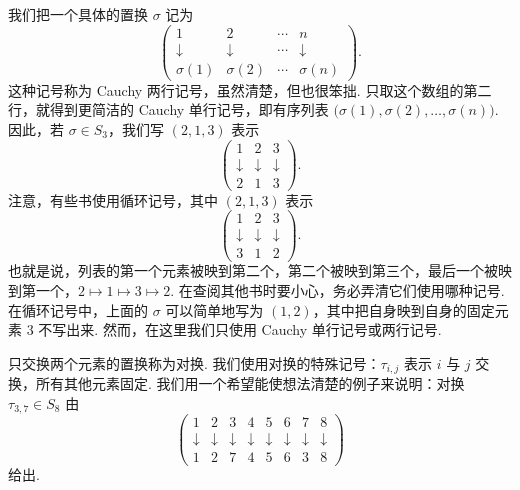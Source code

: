 我们把一个具体的置换 $\sigma$ 记为
\[
\begin{pmatrix}1&2&\cdots&n\\\downarrow&\downarrow&\cdots&\downarrow\\\sigma(1)&\sigma(2)&\cdots&\sigma(n)\end{pmatrix}.
\]
这种记号称为 Cauchy 两行记号，虽然清楚，但也很笨拙. 只取这个数组的第二行，就得到更简洁的 Cauchy 单行记号，即有序列表 $\bigl(\sigma(1),\sigma(2),\ldots,\sigma(n)\bigr)$. 因此，若 $\sigma\in S_3$，我们写 $(2,1,3)$ 表示
\[
\begin{pmatrix}1&2&3\\\downarrow&\downarrow&\downarrow\\2&1&3\end{pmatrix}.
\]
注意，有些书使用循环记号，其中 $(2,1,3)$ 表示
\[
\begin{pmatrix}1&2&3\\\downarrow&\downarrow&\downarrow\\3&1&2\end{pmatrix}.
\]
也就是说，列表的第一个元素被映到第二个，第二个被映到第三个，最后一个被映到第一个，$2\mapsto1\mapsto3\mapsto2$. 在查阅其他书时要小心，务必弄清它们使用哪种记号. 在循环记号中，上面的 $\sigma$ 可以简单地写为 $(1,2)$，其中把自身映到自身的固定元素 3 不写出来. 然而，在这里我们只使用 Cauchy 单行记号或两行记号.

只交换两个元素的置换称为对换. 我们使用对换的特殊记号：$\tau_{i,j}$ 表示 $i$ 与 $j$ 交换，所有其他元素固定. 我们用一个希望能使想法清楚的例子来说明：对换 $\tau_{3,7}\in S_8$ 由
\[
\begin{pmatrix}1&2&3&4&5&6&7&8\\\downarrow&\downarrow&\downarrow&\downarrow&\downarrow&\downarrow&\downarrow&\downarrow\\1&2&7&4&5&6&3&8\end{pmatrix}
\]
给出.

